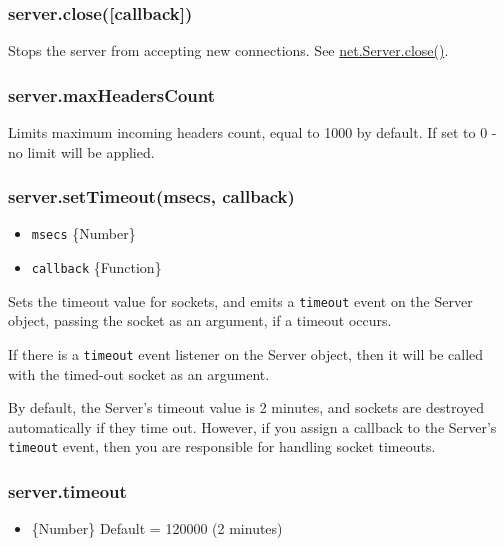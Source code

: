 \subsubsection{server.close({[}callback{]})}\label{server.closecallback}

Stops the server from accepting new connections. See
\href{net.html\#net_server_close_callback}{net.Server.close()}.

\subsubsection{server.maxHeadersCount}\label{server.maxheaderscount}

Limits maximum incoming headers count, equal to 1000 by default. If set
to 0 - no limit will be applied.

\subsubsection{server.setTimeout(msecs,
callback)}\label{server.settimeoutmsecs-callback}

\begin{itemize}
\itemsep1pt\parskip0pt
\item
  \texttt{msecs} \{Number\}
\item
  \texttt{callback} \{Function\}
\end{itemize}

Sets the timeout value for sockets, and emits a
\texttt{\textquotesingle{}timeout\textquotesingle{}} event on the Server
object, passing the socket as an argument, if a timeout occurs.

If there is a \texttt{\textquotesingle{}timeout\textquotesingle{}} event
listener on the Server object, then it will be called with the timed-out
socket as an argument.

By default, the Server's timeout value is 2 minutes, and sockets are
destroyed automatically if they time out. However, if you assign a
callback to the Server's
\texttt{\textquotesingle{}timeout\textquotesingle{}} event, then you are
responsible for handling socket timeouts.

\subsubsection{server.timeout}\label{server.timeout}

\begin{itemize}
\itemsep1pt\parskip0pt
\item
  \{Number\} Default = 120000 (2 minutes)
\end{itemize}

